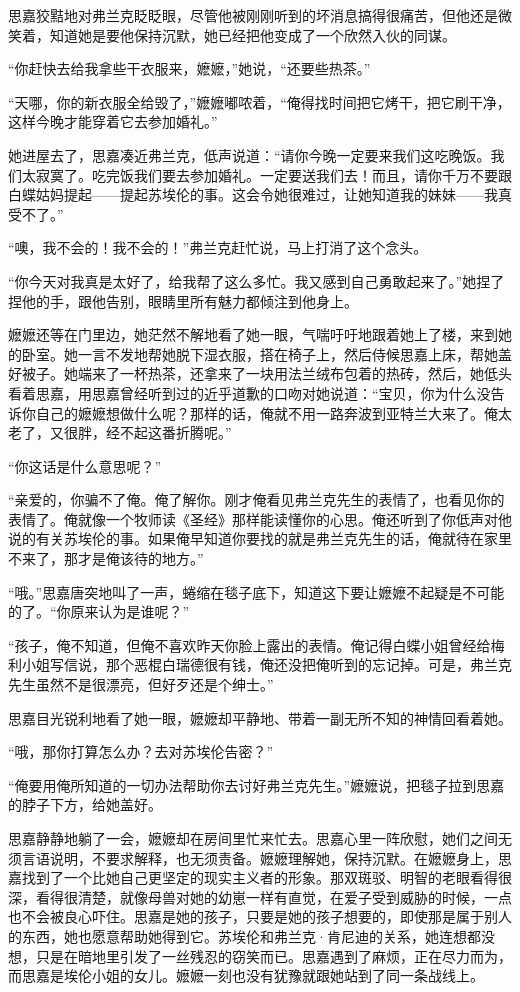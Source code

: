 \par 思嘉狡黠地对弗兰克眨眨眼，尽管他被刚刚听到的坏消息搞得很痛苦，但他还是微笑着，知道她是要他保持沉默，她已经把他变成了一个欣然入伙的同谋。
\par “你赶快去给我拿些干衣服来，嬷嬷，”她说，“还要些热茶。”
\par “天哪，你的新衣服全给毁了，”嬷嬷嘟哝着，“俺得找时间把它烤干，把它刷干净，这样今晚才能穿着它去参加婚礼。”
\par 她进屋去了，思嘉凑近弗兰克，低声说道：“请你今晚一定要来我们这吃晚饭。我们太寂寞了。吃完饭我们要去参加婚礼。一定要送我们去！而且，请你千万不要跟白蝶姑妈提起——提起苏埃伦的事。这会令她很难过，让她知道我的妹妹——我真受不了。”
\par “噢，我不会的！我不会的！”弗兰克赶忙说，马上打消了这个念头。
\par “你今天对我真是太好了，给我帮了这么多忙。我又感到自己勇敢起来了。”她捏了捏他的手，跟他告别，眼睛里所有魅力都倾注到他身上。
\par 嬷嬷还等在门里边，她茫然不解地看了她一眼，气喘吁吁地跟着她上了楼，来到她的卧室。她一言不发地帮她脱下湿衣服，搭在椅子上，然后侍候思嘉上床，帮她盖好被子。她端来了一杯热茶，还拿来了一块用法兰绒布包着的热砖，然后，她低头看着思嘉，用思嘉曾经听到过的近乎道歉的口吻对她说道：“宝贝，你为什么没告诉你自己的嬷嬷想做什么呢？那样的话，俺就不用一路奔波到亚特兰大来了。俺太老了，又很胖，经不起这番折腾呢。”
\par “你这话是什么意思呢？”
\par “亲爱的，你骗不了俺。俺了解你。刚才俺看见弗兰克先生的表情了，也看见你的表情了。俺就像一个牧师读《圣经》那样能读懂你的心思。俺还听到了你低声对他说的有关苏埃伦的事。如果俺早知道你要找的就是弗兰克先生的话，俺就待在家里不来了，那才是俺该待的地方。”
\par “哦。”思嘉唐突地叫了一声，蜷缩在毯子底下，知道这下要让嬷嬷不起疑是不可能的了。“你原来认为是谁呢？”
\par “孩子，俺不知道，但俺不喜欢昨天你脸上露出的表情。俺记得白蝶小姐曾经给梅利小姐写信说，那个恶棍白瑞德很有钱，俺还没把俺听到的忘记掉。可是，弗兰克先生虽然不是很漂亮，但好歹还是个绅士。”
\par 思嘉目光锐利地看了她一眼，嬷嬷却平静地、带着一副无所不知的神情回看着她。
\par “哦，那你打算怎么办？去对苏埃伦告密？”
\par “俺要用俺所知道的一切办法帮助你去讨好弗兰克先生。”嬷嬷说，把毯子拉到思嘉的脖子下方，给她盖好。
\par 思嘉静静地躺了一会，嬷嬷却在房间里忙来忙去。思嘉心里一阵欣慰，她们之间无须言语说明，不要求解释，也无须责备。嬷嬷理解她，保持沉默。在嬷嬷身上，思嘉找到了一个比她自己更坚定的现实主义者的形象。那双斑驳、明智的老眼看得很深，看得很清楚，就像母兽对她的幼崽一样有直觉，在爱子受到威胁的时候，一点也不会被良心吓住。思嘉是她的孩子，只要是她的孩子想要的，即使那是属于别人的东西，她也愿意帮助她得到它。苏埃伦和弗兰克·肯尼迪的关系，她连想都没想，只是在暗地里引发了一丝残忍的窃笑而已。思嘉遇到了麻烦，正在尽力而为，而思嘉是埃伦小姐的女儿。嬷嬷一刻也没有犹豫就跟她站到了同一条战线上。
